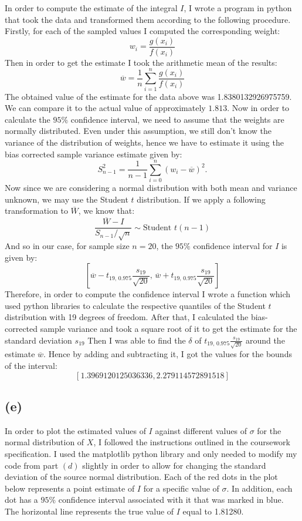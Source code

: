\documentclass[12pt]{article}
\begin{document}
In order to compute the estimate of the integral $ I $, I wrote a program in python that took the data and transformed them according to the following procedure. 
Firstly, for each of the sampled values I computed the corresponding weight:
\[ w_i = \frac{g(x_i)}{f(x_i)}\]
Then in order to get the estimate I took the arithmetic mean of the results:
\[ \overline{w} = \frac{1}{n} \sum_{i=1}^n \frac{g(x_i)}{f(x_i)} \]
The obtained value of the estimate for the data above was 1.8380132926975759. 
We can compare it to the actual value of approximately $1.813$. 
Now in order to calculate the $95\%$ confidence interval, we need to assume that the weights are normally distributed. 
Even under this assumption, we still don't know the variance of the distribution of weights, hence we have to estimate it using the bias corrected 
sample variance estimate given by:
\[ S_{n-1}^2 = \frac{1}{n -1} \sum_{i=0}^n(w_i - \overline{w})^2.\]
Now since we are considering a normal distribution with both mean and variance unknown, 
we may use the Student $t$ distribution. 
If we apply a following transformation to $\overline{W}$, we know that:
\[ \frac{\overline{W} - I} {S_{n-1} / \sqrt{n}} \sim \text{Student } t (n - 1)\]
And so in our case, for sample size $ n = 20 $, the $95\%$ confidence interval for $ I $
is given by:
\[ \left[ \overline{w} - t_{19\text{, }0.975} \frac{s_{19}}{\sqrt{20}} \text{, }\overline{w} + t_{19\text{, }0.975} \frac{s_{19}}{\sqrt{20}} \right] \]
Therefore, in order to compute the confidence interval I wrote a function which used python libraries to calculate the respective quantiles of the Student $t$ distribution with 19 
degrees of freedom.
After that, I calculated the bias-corrected sample variance and took a square root of it to get the estimate for the standard deviation $s_{19}$
Then I was able to find the 
$ \delta $ of $t_{19\text{, }0.975} \frac{s_{19}}{\sqrt{20}}$ around the estimate 
$ \overline{w} $. 
Hence by adding and subtracting it, I got the values for the bounds of the interval:
\[ [1.3969120125036336, 2.279114572891518]\]

\subsection*{(e)}
In order to plot the estimated values of $I$ against different values of $\sigma$ for the 
normal distribution of $ X $, I followed the instructions outlined in the coursework specification. I used the matplotlib python library and only needed to modify my code from part $(d)$ slightly in order to allow for changing the standard deviation of the source normal distribution. Each of the red dots in the plot below represents a point estimate of $ I $ for a specific value of $ \sigma $. In addition, each dot has a $95\%$ confidence interval associated with it that was marked in blue. The horizontal line represents the true value of $ I $ equal to 1.81280.
\end{document}
